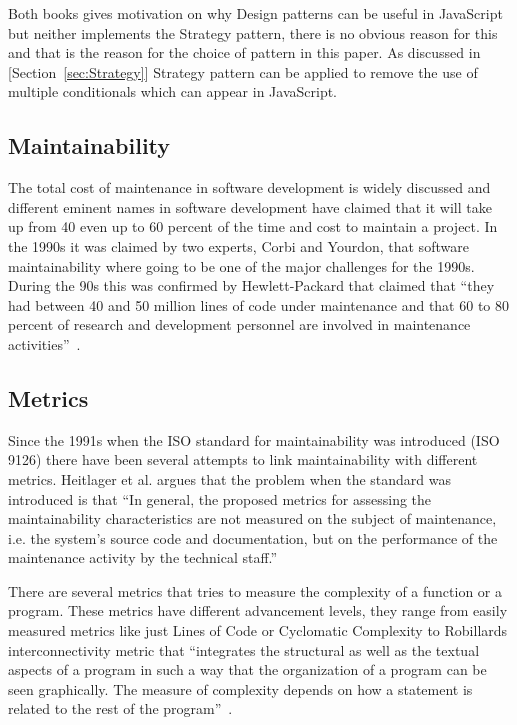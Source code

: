 \documentclass[conference, a4paper]{IEEEtran}
\begin{document}
Both books gives motivation on why Design patterns can be useful in JavaScript but neither implements the Strategy pattern, there is no obvious reason for this and that is the reason for the choice of pattern in this paper. As discussed in [Section~\ref{sec:Strategy}] Strategy pattern can be applied to remove the use of multiple conditionals which can appear in JavaScript.

\subsection{Maintainability}
\label{sec:Maintainability}
The total cost of maintenance in software development is widely discussed and different eminent names in software development have claimed that it will take up from 40 even up to 60 percent of the time and cost to maintain a project. In the 1990s it was claimed by two experts, Corbi and Yourdon, that software maintainability where going to be one of the major challenges for the 1990s. During the 90s this was confirmed by Hewlett-Packard that claimed that ``they had between 40 and 50 million lines of code under maintenance and that 60 to 80 percent of research and development personnel are involved in maintenance activities''~\cite{bibitem:MetricsToEvaluate}.

\subsection{Metrics}
\label{sec:Theory-Metrics}

Since the 1991s when the ISO standard for maintainability was introduced (ISO 9126) there have been several attempts to link maintainability with different metrics. Heitlager et al. argues that the problem when the standard was introduced is that ``In general, the proposed metrics for assessing the maintainability characteristics are not measured on the subject of maintenance, i.e. the system’s source code and documentation, but on the performance of the maintenance activity by the technical staff.''~\cite{bibitem:Maintainability}

There are several metrics that tries to measure the complexity of a function or a program. These metrics have different advancement levels, they range from easily measured metrics like just Lines of Code or Cyclomatic Complexity to Robillards interconnectivity metric that ``integrates the structural as well as the textual aspects of a program in such a way that the organization of a program can be seen graphically. The measure of complexity depends on how a statement is related to the rest of the program''~\cite{bibitem:Robillard}.
\end{document}
